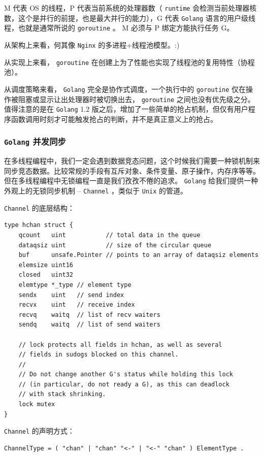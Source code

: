 \documentclass[UTF8]{ctexart}
\begin{document}
    M 代表 OS 的线程，P 代表当前系统的处理器数（ \texttt{runtime} 会检测当前处理器核数，这个是并行的前提，也是最大并行的能力），G 代表 \texttt{Golang} 语言的用户级线程，也就是通常所说的 \texttt{goroutine} 。
M 必须与 P 绑定方能执行任务 G。

从架构上来看，何其像 \texttt{Nginx} 的多进程+线程池模型。:)

从实现上来看， \texttt{goroutine} 在创建上为了性能也实现了线程池的复用特性（协程池）。

    从调度策略来看， \texttt{Golang} 完全是协作式调度，一个执行中的 \texttt{goroutine} 仅在操作被阻塞或显示让出处理器时被切换出去， \texttt{goroutine} 之间也没有优先级之分。
值得注意的是在 \texttt{Golang} 1.2 版之后，增加了一些简单的抢占机制，但仅有用户程序函数调用时刻才可能触发抢占的判断，并不是真正意义上的抢占。

\subsubsection{\texttt{Golang} 并发同步}
\label{sec:org9b6cff8}
在多线程编程中，我们一定会遇到数据竞态问题，这个时候我们需要一种锁机制来同步竞态数据。比较常规的手段有互斥对象、条件变量、原子操作，内存序等等。但在多线程编程中无锁编程一直是我们孜孜不倦的追求。
\texttt{Golang} 给我们提供一种外观上的无锁同步机制 -- \texttt{Channel} ，类似于 \texttt{Unix} 的管道。

\texttt{Channel} 的底层结构：
\lstset{language=go,label= ,caption= ,captionpos=b,numbers=none}
\begin{lstlisting}
type hchan struct {
    qcount   uint           // total data in the queue
    dataqsiz uint           // size of the circular queue
    buf      unsafe.Pointer // points to an array of dataqsiz elements
    elemsize uint16
    closed   uint32
    elemtype *_type // element type
    sendx    uint   // send index
    recvx    uint   // receive index
    recvq    waitq  // list of recv waiters
    sendq    waitq  // list of send waiters

    // lock protects all fields in hchan, as well as several
    // fields in sudogs blocked on this channel.
    //
    // Do not change another G's status while holding this lock
    // (in particular, do not ready a G), as this can deadlock
    // with stack shrinking.
    lock mutex
}
\end{lstlisting}

\texttt{Channel} 的声明方式：
\lstset{language=go,label= ,caption= ,captionpos=b,numbers=none}
\begin{lstlisting}
ChannelType = ( "chan" | "chan" "<-" | "<-" "chan" ) ElementType .
\end{lstlisting}
\end{document}

